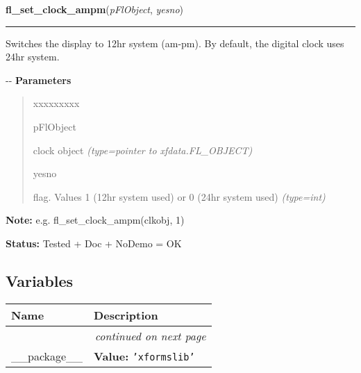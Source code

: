     \vspace{0.5ex}

\hspace{.8\funcindent}\begin{boxedminipage}{\funcwidth}

    \raggedright \textbf{fl\_set\_clock\_ampm}(\textit{pFlObject}, \textit{yesno})

    \vspace{-1.5ex}

    \rule{\textwidth}{0.5\fboxrule}
\setlength{\parskip}{2ex}

Switches the display to 12hr system (am-pm). By default, the
digital clock uses 24hr system.

-{}-
\setlength{\parskip}{1ex}
      \textbf{Parameters}
      \vspace{-1ex}

      \begin{quote}
        \begin{Ventry}{xxxxxxxxx}

          \item[pFlObject]


clock object
            {\it (type=pointer to xfdata.FL\_OBJECT)}

          \item[yesno]


flag. Values 1 (12hr system used) or 0 (24hr system used)
            {\it (type=int)}

        \end{Ventry}

      \end{quote}

\textbf{Note:} 
e.g. fl\_set\_clock\_ampm(clkobj, 1)


\textbf{Status:} 
Tested + Doc + NoDemo = OK


    \end{boxedminipage}



  \subsection{Variables}

    \vspace{-1cm}
\hspace{\varindent}\begin{longtable}{|p{\varnamewidth}|p{\vardescrwidth}|l}
\cline{1-2}
\cline{1-2} \centering \textbf{Name} & \centering \textbf{Description}& \\
\cline{1-2}
\endhead\cline{1-2}\multicolumn{3}{r}{\small\textit{continued on next page}}\\\endfoot\cline{1-2}
\endlastfoot\raggedright \_\-\_\-p\-a\-c\-k\-a\-g\-e\-\_\-\_\- & \raggedright \textbf{Value:} 
{\tt \texttt{'}\texttt{xformslib}\texttt{'}}&\\
\cline{1-2}
\end{longtable}


